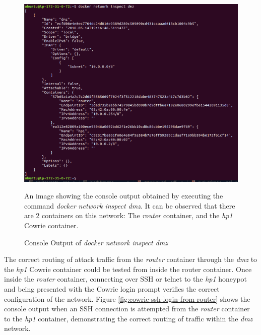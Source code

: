 \begin{figure}[ht]
      \centering
      \includegraphics[width=160mm, scale=1]{Images/docker_network_inspect_dmz.PNG}
      \caption{Console Output of \textit{docker network inspect dmz}} 
      \medskip
      \small
		An image showing the console output obtained by executing the command \textit{docker network inspect dmz}. It can be observed that there are 2 containers on this network: The \textit{router} container, and the \textit{hp1} Cowrie container. 
\label{fig:docker-network-inspect-dmz}
\end{figure}


The correct routing of attack traffic from the \textit{router} container through the \textit{dmz} to the \textit{hp1} Cowrie container could be tested from inside the router container. Once inside the \textit{router} container, connecting over SSH or telnet to the \textit{hp1} honeypot and being presented with the Cowrie login prompt verifies the correct configuration of the network. Figure \ref{fig:cowrie-ssh-login-from-router} shows the console output when an SSH connection is attempted from the \textit{router} container to the \textit{hp1} container, demonstrating the correct routing of traffic within the \textit{dmz} network.

